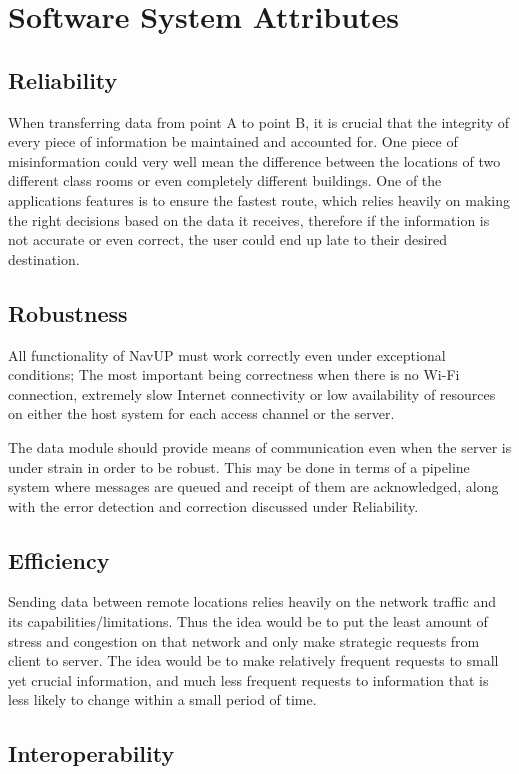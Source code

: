 \documentclass[11pt]{article}
\begin{document}
	\section{Software System Attributes}
	\subsection{Reliability}
	When transferring data from point A to point B, it is crucial that the integrity of every piece of information be maintained and accounted for.  One piece of misinformation could very well mean the difference between the locations of two different class rooms or even completely different buildings.  One of the applications features is to ensure the fastest route, which relies heavily on making the right decisions based on the data it receives, therefore if the information is not accurate or even correct, the user could end up late to their desired destination.
	\subsection{Robustness}
	All functionality of NavUP must work correctly even under exceptional conditions; The most important being correctness when there is no Wi-Fi connection, extremely slow Internet connectivity or low availability of resources on either the host system for each access channel or the server.
	
	The data module should provide means of communication even when the server is under strain in order to be robust. This may be done in terms of a pipeline system where messages are queued and receipt of them are acknowledged, along with the error detection and correction discussed under Reliability.
	\subsection{Efficiency}
	Sending data between remote locations relies heavily on the network traffic and its capabilities/limitations.  Thus the idea would be to put the least amount of stress and congestion on that network and only make strategic requests from client to server.  The idea would be to make relatively frequent requests to small yet crucial information, and much less frequent requests to information that is less likely to change within a small period of time.
	\subsection{Interoperability}
\end{document}
